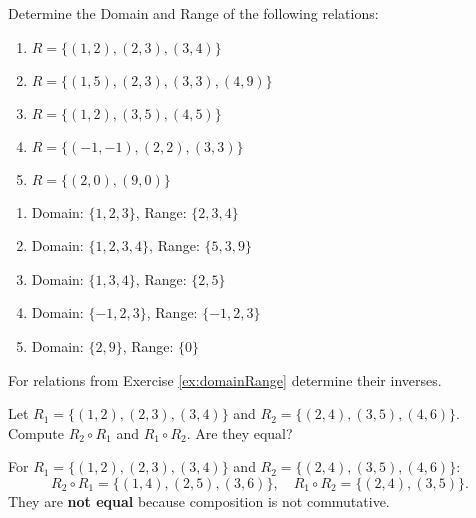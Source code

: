 \documentclass[11pt,paper=b5,footinclude,headinclude]{scrbook} %
\theoremstyle{remark}
\theoremstyle{definition} %
\theoremstyle{theorem} %
\newtheorem{ex}{Exercise\hypertarget{sol:\theex}}[chapter]
\begin{document}
\begin{ex}\label{ex:domainRange}
    Determine the Domain and Range of the following relations:
    \begin{enumerate}
    \item \(R = \{(1, 2), (2, 3), (3, 4)\}\)
    \item \(R = \{(1, 5), (2, 3), (3, 3), (4, 9)\}\)
    \item \(R = \{(1, 2), (3, 5), (4, 5)\}\)
    \item \(R = \{(-1, -1), (2, 2), (3, 3)\}\)
    \item \(R = \{(2, 0), (9, 0)\}\)
\end{enumerate}
\begin{sol}
    \begin{enumerate}
    \item Domain: \(\{1, 2, 3\}\), Range: \(\{2, 3, 4\}\)
    \item Domain: \(\{1, 2, 3, 4\}\), Range: \(\{5, 3, 9\}\)
    \item Domain: \(\{1, 3, 4\}\), Range: \(\{2, 5\}\)
    \item Domain: \(\{-1, 2, 3\}\), Range: \(\{-1, 2, 3\}\)
    \item Domain: \(\{2, 9\}\), Range: \(\{0\}\)
\end{enumerate}

\end{sol}
\end{ex}
\begin{ex}
    For relations from Exercise \ref{ex:domainRange} determine their inverses.
\end{ex}

\begin{ex}
    Let \(R_1 = \{(1, 2), (2, 3), (3, 4)\}\) and \(R_2 = \{(2, 4), (3, 5), (4, 6)\}\). Compute \(R_2 \circ R_1\) and \(R_1 \circ R_2\). Are they equal?

    \begin{sol}
        For \(R_1 = \{(1, 2), (2, 3), (3, 4)\}\) and \(R_2 = \{(2, 4), (3, 5), (4, 6)\}\):
    \[
    R_2 \circ R_1 = \{(1, 4), (2, 5), (3, 6)\}, \quad R_1 \circ R_2 = \{(2, 4), (3, 5)\}.
    \]
    They are \textbf{not equal} because composition is not commutative.
    \end{sol}
\end{ex}
\end{document}

